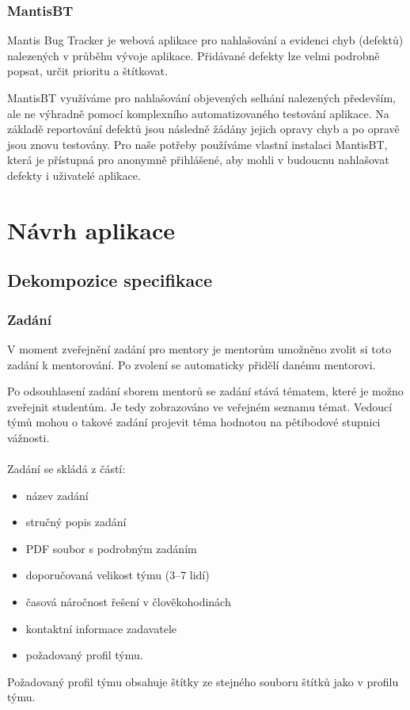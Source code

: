 \documentclass[czech,BP]{thesiskiv}
\begin{document}
\subsection{MantisBT}
	\par Mantis Bug Tracker je webová aplikace pro nahlašování a evidenci chyb (defektů) nalezených v průběhu vývoje aplikace. Přidávané defekty lze velmi podrobně popsat, určit prioritu a štítkovat.
	\par MantisBT využíváme pro nahlašování objevených selhání nalezených především, ale ne výhradně pomocí komplexního automatizovaného testování aplikace. Na základě reportování defektů jsou následně žádány jejich opravy chyb a po opravě jsou znovu testovány. Pro naše potřeby používáme vlastní instalaci MantisBT, která je přístupná pro anonymně přihlášené, aby mohli v budoucnu nahlašovat defekty i uživatelé aplikace.
\chapter{Návrh aplikace}

	\section{Dekompozice specifikace}
		\subsection{Zadání}
		\par V moment zveřejnění zadání pro mentory je mentorům umožněno zvolit si toto zadání k mentorování. Po zvolení se automaticky přidělí danému mentorovi.
		\par Po odsouhlasení zadání sborem mentorů se zadání stává tématem, které je možno zveřejnit studentům. Je tedy zobrazováno ve veřejném seznamu témat. Vedoucí týmů mohou o takové zadání projevit téma hodnotou na pětibodové stupnici vážnosti.\\\\
		Zadání se skládá z částí:
		\begin{itemize}
			\item název zadání
			\item stručný popis zadání
			\item PDF soubor s podrobným zadáním
			\item doporučovaná velikost týmu (3--7 lidí)
			\item časová náročnost řešení v člověkohodinách
			\item kontaktní informace zadavatele
			\item požadovaný profil týmu.
		\end{itemize}
		\par Požadovaný profil týmu obsahuje štítky ze stejného souboru štítků jako v profilu týmu.
\end{document}
